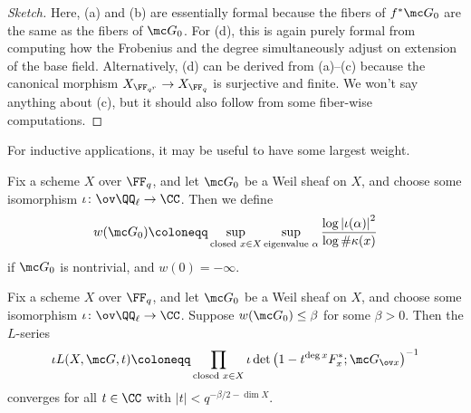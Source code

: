 \documentclass[../notes.tex]{subfiles}
\begin{document}
\begin{proof}[Sketch]
	Here, (a) and (b) are essentially formal because the fibers of $f^*\mc G_0$ are the same as the fibers of $\mc G_0$. For (d), this is again purely formal from computing how the Frobenius and the degree simultaneously adjust on extension of the base field. Alternatively, (d) can be derived from (a)--(c) because the canonical morphism $X_{\FF_{q^r}}\to X_{\FF_q}$ is surjective and finite. We won't say anything about (c), but it should also follow from some fiber-wise computations.
\end{proof}
For inductive applications, it may be useful to have some largest weight.
\begin{definition}
	Fix a scheme $X$ over $\FF_q$, and let $\mc G_0$ be a Weil sheaf on $X$, and choose some isomorphism $\iota\colon\ov\QQ_\ell\to\CC$. Then we define
	\[w(\mc G_0)\coloneqq\sup_{\text{closed }x\in X}\sup_{\text{eigenvalue }\alpha}\frac{\log\left|\iota(\alpha)\right|^2}{\log\#\kappa(x)}\]
	if $\mc G_0$ is nontrivial, and $w(0)=-\infty$.
\end{definition}
\begin{lemma}
	Fix a scheme $X$ over $\FF_q$, and let $\mc G_0$ be a Weil sheaf on $X$, and choose some isomorphism $\iota\colon\ov\QQ_\ell\to\CC$. Suppose $w(\mc G_0)\le\beta$ for some $\beta>0$. Then the $L$-series
	\[\iota L(X,\mc G,t)\coloneqq\prod_{\text{closed }x\in X}\iota\det\left(1-t^{\deg x}F_x^*;\mc G_{\ov x}\right)^{-1}\]
	converges for all $t\in\CC$ with $\left|t\right|<q^{-\beta/2-\dim X}$.
\end{lemma}
\end{document}
